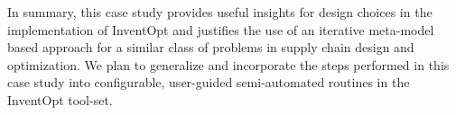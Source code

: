 In summary, this case study provides useful insights for design choices in the implementation of InventOpt and justifies the use of an iterative meta-model based approach for a similar class of problems in supply chain design and optimization. We plan to generalize and incorporate the steps performed in this case study into configurable, user-guided semi-automated routines in the InventOpt tool-set.
 



